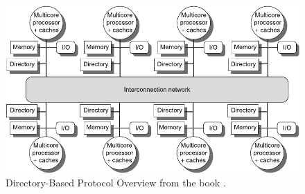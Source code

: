 \newpage

\begin{figure}
    \centering
    \includegraphics[width=\textwidth]{img/directory-based-protocol.pdf}
    \caption{Directory-Based Protocol Overview from the book \cite{hennessy2017computer}.}
\end{figure}

